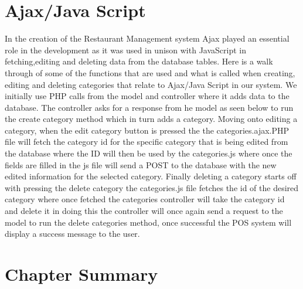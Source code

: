 \section{Ajax/Java Script}
In the creation of the Restaurant Management system Ajax played an essential role in the development as it was used in unison with JavaScript in fetching,editing and deleting data from the database tables.
\newline
\newline
Here is a walk through of some of the functions that are used and what is called when creating, editing and deleting categories that relate to Ajax/Java Script in our system.
\newline
\newline
We initially use PHP calls from the model and controller where it adds data to the database.
The controller asks for a response from he model as seen below to run the create category method which in turn adds a category.
\newline
\newline
Moving onto editing a category, when the edit category button is pressed the the categories.ajax.PHP file will fetch the category id for the specific category that is being edited from the database where the ID will then be used by the categories.js where once the fields are filled in the js file will send a POST to the database with the new edited information for the selected category.
\newline
\newline
Finally deleting a category starts off with pressing the delete category the categories.js file fetches the id of the desired category where once fetched the categories controller will take the category id and delete it in doing this the controller will once again send a request to the model to run the delete categories method, once successful the POS system will display a success message to the user.
 



\section{Chapter Summary}

